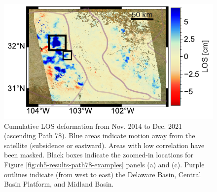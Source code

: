 \begin{figure}[h]
	\centering
	\includegraphics[width=.99\textwidth]{figures/chapter5-lowess/figure-results-los-path78.pdf}
	\caption[Cumulative 7-year LOS deformation for  Sentinel-1 ascending Path 78]{
		Cumulative LOS deformation from Nov. 2014 to Dec. 2021 (ascending Path 78). Blue areas indicate motion away from the satellite (subsidence or eastward). Areas with low correlation have been masked.
		Black boxes indicate the zoomed-in locations for Figure \ref{fig:ch5-results-path78-examples} panels (a) and (c).
		Purple outlines indicate (from west to east) the Delaware Basin, Central Basin Platform, and Midland Basin.
	}
	\label{fig:ch5-results-path78}
\end{figure}


